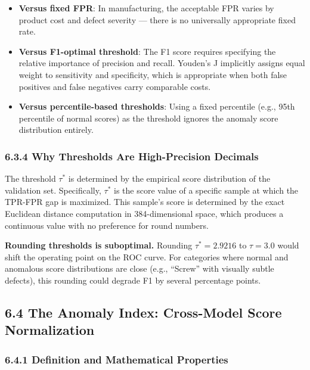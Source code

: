 \documentclass[12pt, a4paper, oneside]{report}
\begin{document}
\begin{itemize}
\item
  \textbf{Versus fixed FPR}: In manufacturing, the acceptable FPR varies by product cost and defect severity --- there is no universally appropriate fixed rate.
\item
  \textbf{Versus F1-optimal threshold}: The F1 score requires specifying the relative importance of precision and recall. Youden's J implicitly assigns equal weight to sensitivity and specificity, which is appropriate when both false positives and false negatives carry comparable costs.
\item
  \textbf{Versus percentile-based thresholds}: Using a fixed percentile (e.g., 95th percentile of normal scores) as the threshold ignores the anomaly score distribution entirely.
\end{itemize}

\subsubsection{6.3.4 Why Thresholds Are High-Precision Decimals}\label{why-thresholds-are-high-precision-decimals}

The threshold \(\tau^*\) is determined by the empirical score distribution of the validation set. Specifically, \(\tau^*\) is the score value of a specific sample at which the TPR-FPR gap is maximized. This sample's score is determined by the exact Euclidean distance computation in 384-dimensional space, which produces a continuous value with no preference for round numbers.

\textbf{Rounding thresholds is suboptimal.} Rounding \(\tau^* = 2.9216\) to \(\tau = 3.0\) would shift the operating point on the ROC curve. For categories where normal and anomalous score distributions are close (e.g., ``Screw'' with visually subtle defects), this rounding could degrade F1 by several percentage points.

\bigskip\noindent\hrulefill\bigskip

\subsection{6.4 The Anomaly Index: Cross-Model Score Normalization}\label{the-anomaly-index-cross-model-score-normalization}

\subsubsection{6.4.1 Definition and Mathematical Properties}\label{definition-and-mathematical-properties}
\end{document}
